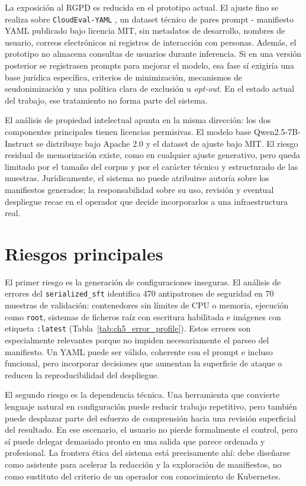 La exposición al RGPD es reducida en el prototipo actual. El ajuste fino se realiza sobre
\texttt{CloudEval-YAML} \citep{cloudeval2023}, un dataset técnico de pares prompt - manifiesto
YAML publicado bajo licencia MIT, sin metadatos de desarrollo, nombres de usuario, correos
electrónicos ni registros de interacción con personas. Además, el prototipo no almacena
consultas de usuarios durante inferencia. Si en una versión posterior se registrasen prompts
para mejorar el modelo, esa fase sí exigiría una base jurídica específica, criterios de
minimización, mecanismos de seudonimización y una política clara de exclusión u
\textit{opt-out}. En el estado actual del trabajo, ese tratamiento no forma parte del sistema.

El análisis de propiedad intelectual apunta en la misma dirección: los dos componentes
principales tienen licencias permisivas. El modelo base Qwen2.5-7B-Instruct
\citep{qwen2024qwen25} se distribuye bajo Apache 2.0 y el dataset de ajuste bajo MIT. El riesgo
residual de memorización existe, como en cualquier ajuste generativo, pero queda limitado por el
tamaño del corpus y por el carácter técnico y estructurado de las muestras. Jurídicamente, el
sistema no puede atribuirse autoría sobre los manifiestos generados; la responsabilidad sobre su
uso, revisión y eventual despliegue recae en el operador que decide incorporarlos a una
infraestructura real.


\section{Riesgos principales}
\label{sec:ch8_risks}

El primer riesgo es la generación de configuraciones inseguras. El análisis de errores del
\texttt{serialized\_sft} identifica 470 antipatrones de seguridad en 70 muestras de validación:
contenedores sin límites de CPU o memoria, ejecución como \texttt{root}, sistemas de ficheros
raíz con escritura habilitada e imágenes con etiqueta \texttt{:latest}
(Tabla~\ref{tab:ch5_error_profile}). Estos errores son especialmente relevantes porque no
impiden necesariamente el parseo del manifiesto. Un YAML puede ser válido, coherente con el
prompt e incluso funcional, pero incorporar decisiones que aumentan la superficie de ataque o
reducen la reproducibilidad del despliegue.

El segundo riesgo es la dependencia técnica. Una herramienta que convierte lenguaje natural en
configuración puede reducir trabajo repetitivo, pero también puede desplazar parte del esfuerzo
de comprensión hacia una revisión superficial del resultado. En ese escenario, el usuario no
pierde formalmente el control, pero sí puede delegar demasiado pronto en una salida que parece
ordenada y profesional. La frontera ética del sistema está precisamente ahí: debe diseñarse como
asistente para acelerar la redacción y la exploración de manifiestos, no como sustituto del
criterio de un operador con conocimiento de Kubernetes.

